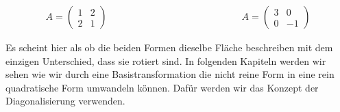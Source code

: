 \begin{figure}[h]
    \centering
    \begin{minipage}{0.4\textwidth}
        \centering
    \end{minipage}
    \hfill
    \begin{minipage}{0.4\textwidth}
        \centering
    \end{minipage}
\end{figure}

\begin{equation*}
    \begin{aligned}
        A = \begin{pmatrix} 1 & 2 \\ 2 & 1 \end{pmatrix} \qquad \qquad \qquad \qquad \qquad \qquad \qquad A = \begin{pmatrix} 3 & 0 \\ 0 & -1 \end{pmatrix}
    \end{aligned}
\end{equation*}

\vspace{0.5\baselineskip}

Es scheint hier als ob die beiden Formen dieselbe Fläche beschreiben mit dem einzigen Unterschied, dass sie rotiert sind. In folgenden Kapiteln werden wir sehen wie wir durch eine Basistransformation die nicht reine Form in eine rein quadratische Form umwandeln können. Dafür werden wir das Konzept der Diagonalisierung verwenden.